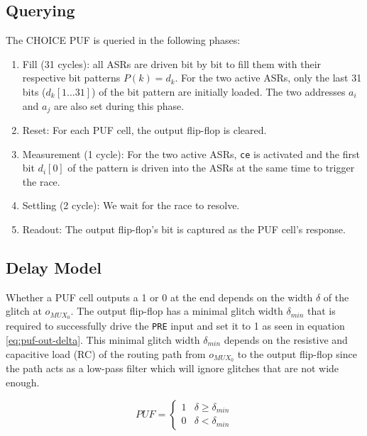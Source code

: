 \subsection{Querying}
The CHOICE PUF is queried in the following phases:
\begin{enumerate}
    \item Fill (31 cycles): all ASRs are driven bit by bit to fill them with their respective bit patterns $P(k) = d_k$. For the two active ASRs, only the last 31 bits ($d_k[1\ldots31]$) of the bit pattern are initially loaded. The two addresses $a_i$ and $a_j$ are also set during this phase.
    \item Reset: For each PUF cell, the output flip-flop is cleared.
    \item Measurement (1 cycle): For the two active ASRs, \verb|ce| is activated and the first bit $d_i[0]$ of the pattern is driven into the ASRs at the same time to trigger the race.
    \item Settling (2 cycle): We wait for the race to resolve.
    \item Readout: The output flip-flop's bit is captured as the PUF cell's response. 
\end{enumerate}

\subsection{Delay Model}
Whether a PUF cell outputs a 1 or 0 at the end depends on the width $\delta$ of the glitch at $o_{MUX_0}$. The output flip-flop has a minimal glitch width $\delta_{min}$ that is required to successfully drive the \verb|PRE| input and set it to 1 as seen in equation \ref{eq:puf-out-delta}. This minimal glitch width $\delta_{min}$ depends on the resistive and capacitive load (RC) of the routing path from $o_{MUX_0}$ to the output flip-flop since the path acts as a low-pass filter which will ignore glitches that are not wide enough. 

\begin{equation}
PUF =
\begin{cases}
1 & \delta \ge \delta_{min} \\
0 & \delta < \delta_{min} 
\end{cases}
\label{eq:puf-out-delta}
\end{equation}

